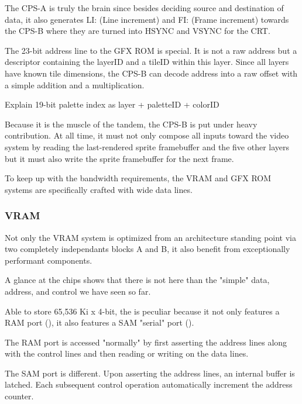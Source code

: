 The CPS-A is truly the brain since besides deciding source and destination of data, it also generates LI: (Line increment) and FI: (Frame increment) towards the CPS-B where they are turned into HSYNC and VSYNC for the CRT.

The 23-bit address line to the GFX ROM is special. It is not a raw address but a descriptor containing the layerID and a tileID within this layer. Since all layers have known tile dimensions, the CPS-B can decode address into a raw offset with a simple addition and a multiplication.

Explain 19-bit palette index as layer + paletteID + colorID


Because it is the muscle of the tandem, the CPS-B is put under heavy contribution. At all time, it must not only compose all inputs toward the video system by reading the last-rendered sprite framebuffer and the five other layers but it must also write the sprite framebuffer for the next frame.


To keep up with the bandwidth requirements, the VRAM and GFX ROM systems are specifically crafted with wide data lines.








\subsubsection{VRAM}
Not only the VRAM system is optimized from an architecture standing point via two completely independants blocks A and B, it also benefit from exceptionally performant components.

A glance at the  chips shows that there is not here than the "simple" data, address, and control we have seen so far.


Able to store 65,536 Ki x 4-bit, the  is peculiar because it not only features a RAM port (), it also features a SAM "serial" port ().
 
The RAM port is accessed "normally" by first asserting the address lines along with the control lines and then reading or writing on the data lines.

The SAM port is different. Upon asserting the address lines, an internal buffer is latched. Each subsequent control operation automatically increment the address counter.

